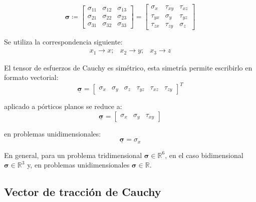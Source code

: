 	\begin{equation}
		\bm{\sigma} \coloneqq \begin{bmatrix}
			\sigma_{11} & \sigma_{12} & \sigma_{13} \\
			\sigma_{21} & \sigma_{22} & \sigma_{23} \\
			\sigma_{31} & \sigma_{32} & \sigma_{33}
		\end{bmatrix} = \begin{bmatrix}
			\sigma_x & \tau_{xy} & \tau_{xz} \\
			\tau_{yx} & \sigma_y & \tau_{yz} \\
			\tau_{zx} & \tau_{zy} & \sigma_z
		\end{bmatrix}
		\label{CauchyTensor}
	\end{equation}
	
	Se utiliza la correspondencia siguiente:
	\begin{equation*}
		\begin{array}{ccc}
			x_1 \rightarrow x; & x_2 \rightarrow y; & x_3 \rightarrow z
		\end{array}
	\end{equation*}
	
	El tensor de esfuerzos de Cauchy es simétrico, esta simetría permite escribirlo en formato vectorial:
	\begin{equation}
	    \underline{\bm{\sigma}} = \begin{bmatrix} \sigma_x & \sigma_y & \sigma_z & \tau_{yz} & \tau_{xz} & \tau_{zy} \end{bmatrix}^T
	\end{equation}
	
	aplicado a pórticos planos se reduce a:
	\begin{equation}
	    \underline{\bm{\sigma}} = \begin{bmatrix} \sigma_{x} & \sigma_{y} & \tau_{xy} \end{bmatrix}
	\end{equation}
	
	en problemas unidimensionales:
	\begin{equation}
	    \underline{\bm{\sigma}} = \sigma_x
	\end{equation}

En general, para un problema tridimensional $\bm{\sigma} \in \mathbb{R}^6$, en el caso bidimensional $\bm{\sigma} \in \mathbb{R}^3$ y, en problemas unidimensionales $\bm{\sigma} \in \mathbb{R}$.

\subsection{Vector de tracción de Cauchy}
	
